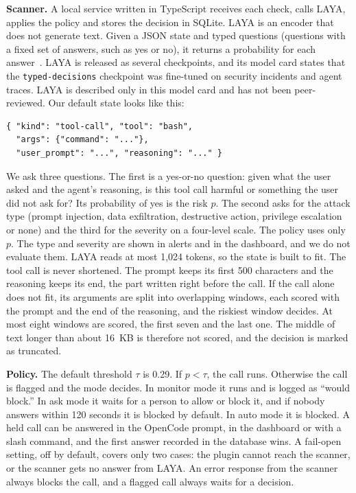 \documentclass[sigconf,nonacm]{acmart}
\begin{document}
\textbf{Scanner.} A local service written in TypeScript receives each check, calls LAYA, applies the policy and stores the decision in SQLite. LAYA is an encoder that does not generate text. Given a JSON state and typed questions (questions with a fixed set of answers, such as yes or no), it returns a probability for each answer~\cite{laya}. LAYA is released as several checkpoints, and its model card states that the \texttt{typed-decisions} checkpoint was fine-tuned on security incidents and agent traces. LAYA is described only in this model card and has not been peer-reviewed. Our default state looks like this:
\begin{small}
\begin{verbatim}
{ "kind": "tool-call", "tool": "bash",
  "args": {"command": "..."},
  "user_prompt": "...", "reasoning": "..." }
\end{verbatim}
\end{small}
We ask three questions. The first is a yes-or-no question: given what the user asked and the agent's reasoning, is this tool call harmful or something the user did not ask for? Its probability of yes is the risk $p$. The second asks for the attack type (prompt injection, data exfiltration, destructive action, privilege escalation or none) and the third for the severity on a four-level scale. The policy uses only $p$. The type and severity are shown in alerts and in the dashboard, and we do not evaluate them. LAYA reads at most 1,024 tokens, so the state is built to fit. The tool call is never shortened. The prompt keeps its first 500 characters and the reasoning keeps its end, the part written right before the call. If the call alone does not fit, its arguments are split into overlapping windows, each scored with the prompt and the end of the reasoning, and the riskiest window decides. At most eight windows are scored, the first seven and the last one. The middle of text longer than about 16~KB is therefore not scored, and the decision is marked as truncated.

\textbf{Policy.} The default threshold $\tau$ is 0.29. If $p<\tau$, the call runs. Otherwise the call is flagged and the mode decides. In monitor mode it runs and is logged as ``would block.'' In ask mode it waits for a person to allow or block it, and if nobody answers within 120 seconds it is blocked by default. In auto mode it is blocked. A held call can be answered in the OpenCode prompt, in the dashboard or with a slash command, and the first answer recorded in the database wins. A fail-open setting, off by default, covers only two cases: the plugin cannot reach the scanner, or the scanner gets no answer from LAYA. An error response from the scanner always blocks the call, and a flagged call always waits for a decision.
\end{document}
